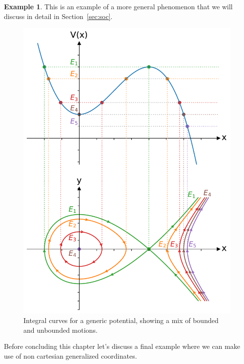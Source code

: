 \documentclass[english,fontsize=11pt,paper=b5]{scrbook}
\numberwithin{equation}{chapter}
\theoremstyle{definition}
\newtheorem{example}{Example}[chapter]
\begin{document}
\begin{example}
      This is an example of a more general phenomenon that we will discuss in detail in Section~\ref{sec:soc}.
    \end{example}

    \begin{figure}[htbp]
      \centering
      \includegraphics[width=.7\linewidth]{images/potential-curves.pdf}
      \caption{Integral curves for a generic potential, showing a mix of bounded and unbounded motions.}
      \label{fig:potential-curves}
    \end{figure}

    Before concluding this chapter let's discuss a final example where we can make use of non cartesian generalized coordinates.
\end{document}
